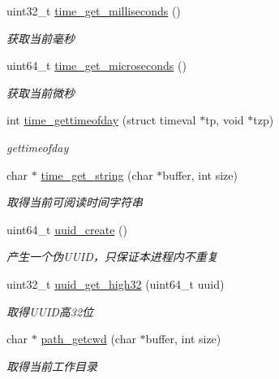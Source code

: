 \begin{DoxyCompactItemize}
uint32\+\_\+t \hyperlink{a00100_a528d27a7218cb2fdabf81ca343e24fc9_a528d27a7218cb2fdabf81ca343e24fc9}{time\+\_\+get\+\_\+milliseconds} ()
\begin{DoxyCompactList}\small\item\em 获取当前毫秒 \end{DoxyCompactList}\item 
uint64\+\_\+t \hyperlink{a00100_a5eb6de730bc28be3fbc402b9841c1819_a5eb6de730bc28be3fbc402b9841c1819}{time\+\_\+get\+\_\+microseconds} ()
\begin{DoxyCompactList}\small\item\em 获取当前微秒 \end{DoxyCompactList}\item 
int \hyperlink{a00100_a3cab12b4908938ca999206a67c8ee032_a3cab12b4908938ca999206a67c8ee032}{time\+\_\+gettimeofday} (struct timeval $\ast$tp, void $\ast$tzp)
\begin{DoxyCompactList}\small\item\em gettimeofday \end{DoxyCompactList}\item 
char $\ast$ \hyperlink{a00100_a6d3f7fda67a3c61f767f7b2dbfcbe4ee_a6d3f7fda67a3c61f767f7b2dbfcbe4ee}{time\+\_\+get\+\_\+string} (char $\ast$buffer, int size)
\begin{DoxyCompactList}\small\item\em 取得当前可阅读时间字符串 \end{DoxyCompactList}\item 
uint64\+\_\+t \hyperlink{a00100_a2b1df51bc127460a3bf25949068bfe92_a2b1df51bc127460a3bf25949068bfe92}{uuid\+\_\+create} ()
\begin{DoxyCompactList}\small\item\em 产生一个伪\+U\+U\+I\+D，只保证本进程内不重复 \end{DoxyCompactList}\item 
uint32\+\_\+t \hyperlink{a00100_a200dc3080cb5e5b5320c9f61ecccd31b_a200dc3080cb5e5b5320c9f61ecccd31b}{uuid\+\_\+get\+\_\+high32} (uint64\+\_\+t uuid)
\begin{DoxyCompactList}\small\item\em 取得\+U\+U\+I\+D高32位 \end{DoxyCompactList}\item 
char $\ast$ \hyperlink{a00100_a6c98a04f00772c05a1f51afc185f7513_a6c98a04f00772c05a1f51afc185f7513}{path\+\_\+getcwd} (char $\ast$buffer, int size)
\begin{DoxyCompactList}\small\item\em 取得当前工作目录 \end{DoxyCompactList}\item 

\end{DoxyCompactItemize}
